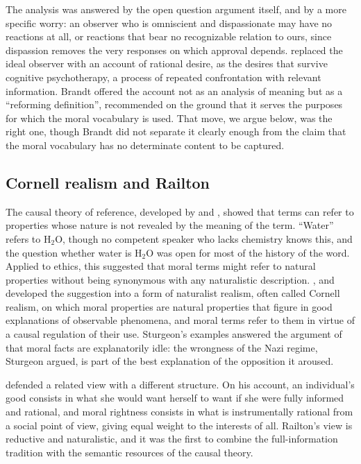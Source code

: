 \documentclass{situationist-preprint}
\begin{document}
The analysis was answered by the open question argument itself, and by a more specific worry: an observer who is omniscient and dispassionate may have no reactions at all, or reactions that bear no recognizable relation to ours, since dispassion removes the very responses on which approval depends. \citet{Brandt1979} replaced the ideal observer with an account of rational desire, as the desires that survive cognitive psychotherapy, a process of repeated confrontation with relevant information. Brandt offered the account not as an analysis of meaning but as a \enquote{reforming definition}, recommended on the ground that it serves the purposes for which the moral vocabulary is used. That move, we argue below, was the right one, though Brandt did not separate it clearly enough from the claim that the moral vocabulary has no determinate content to be captured.

\subsection{Cornell realism and Railton}

The causal theory of reference, developed by \citet{Kripke1980} and \citet{Putnam1975}, showed that terms can refer to properties whose nature is not revealed by the meaning of the term. \enquote{Water} refers to H$_2$O, though no competent speaker who lacks chemistry knows this, and the question whether water is H$_2$O was open for most of the history of the word. Applied to ethics, this suggested that moral terms might refer to natural properties without being synonymous with any naturalistic description. \citet{Sturgeon1985}, \citet{Boyd1988} and \citet{Brink1989} developed the suggestion into a form of naturalist realism, often called Cornell realism, on which moral properties are natural properties that figure in good explanations of observable phenomena, and moral terms refer to them in virtue of a causal regulation of their use. Sturgeon's examples answered the argument of \citet{Harman1977} that moral facts are explanatorily idle: the wrongness of the Nazi regime, Sturgeon argued, is part of the best explanation of the opposition it aroused.

\citet{Railton1986} defended a related view with a different structure. On his account, an individual's good consists in what she would want herself to want if she were fully informed and rational, and moral rightness consists in what is instrumentally rational from a social point of view, giving equal weight to the interests of all. Railton's view is reductive and naturalistic, and it was the first to combine the full-information tradition with the semantic resources of the causal theory.
\end{document}
